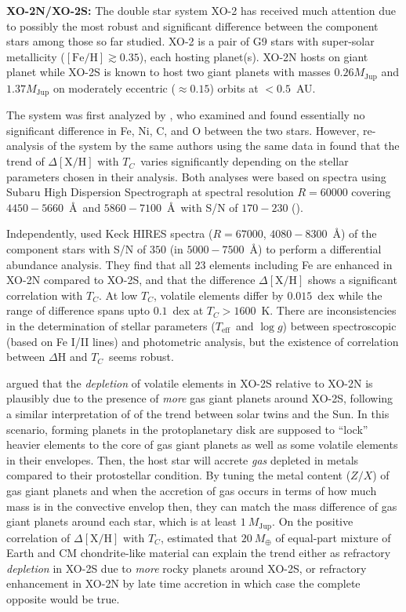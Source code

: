 \documentclass[manuscript]{aastex6}
\newcommand*\elem[1]{\ensuremath{\mathrm{#1}}}
\newcommand*\elemH[1]{\ensuremath{[\mathrm{#1}/\elem{H}]}}
\newcommand*\teff{\ensuremath{T_\mathrm{eff}}}
\newcommand*\logg{\ensuremath{\log{g}}}
\newcommand*{\feh}{\ensuremath{\elemH{Fe}}}
\newcommand{\Tcondens}{\ensuremath{T_C}}
\newcommand{\mearth}{\ensuremath{M_\oplus}}
\newcommand{\mjupiter}{\ensuremath{M_\mathrm{Jup}}}
\begin{document}
{\bf XO-2N/XO-2S:}
The double star system XO-2 has received much attention due to
possibly the most robust and significant difference between the component stars
among those so far studied.
XO-2 is a pair of G9 stars with super-solar metallicity ($\feh \gtrsim 0.35$),
each hosting planet(s).
XO-2N hosts on giant planet while XO-2S is known to host two giant planets with
masses $0.26 \mjupiter$ and $1.37 \mjupiter$ on moderately eccentric ($\approx
0.15$) orbits at $<0.5$~AU.

The system was first analyzed by \citealt{Teske:2013aa}, who examined and found
essentially no significant difference in Fe, Ni, C, and O between the two
stars.
However, re-analysis of the system by the same authors using the same data in
\citealt{Teske:2015aa} found that the trend of $\Delta\elemH{X}$ with
\Tcondens\ varies significantly depending on the stellar parameters chosen in
their analysis. Both analyses were based on spectra
using Subaru High Dispersion Spectrograph at spectral resolution $R=60000$
covering $4450-5660$~\AA\ and $5860-7100$~\AA\ with S/N of $170-230$
(\citealt{Teske:2013aa}).

Independently, \citealt{Ramirez:2015aa} used Keck HIRES spectra ($R=67000$,
$4080-8300$~\AA) of the component stars with S/N of $350$ (in $5000-7500$~\AA)
to perform a differential abundance analysis.
They find that all 23 elements including Fe are enhanced in XO-2N
compared to XO-2S, and that the difference $\Delta\elemH{X}$ shows
a significant correlation with \Tcondens.
At low \Tcondens, volatile elements differ by $0.015$~dex
while the range of difference spans upto $0.1$~dex at $\Tcondens>1600$~K.
There are inconsistencies in the determination of stellar parameters
(\teff\ and \logg) between spectroscopic (based on Fe I/II lines)
and photometric analysis,
but the existence of correlation between $\Delta\elem{H}$ and
\Tcondens\ seems robust.

\citealt{Ramirez:2015aa} argued that the {\it depletion} of volatile elements
in XO-2S relative to XO-2N is plausibly due to the presence of {\it more} gas
giant planets around XO-2S, following a similar interpretation of
\citealt{Melendez:2009aa} of the trend between solar twins and the Sun.
In this scenario, forming planets in the protoplanetary disk are supposed to
``lock'' heavier elements to the core of gas giant planets as well as some
volatile elements in their envelopes. Then, the host star will accrete {\it
  gas} depleted in metals compared to their protostellar condition.
By tuning the metal content ($Z/X$) of gas giant planets and when the accretion
of gas occurs in terms of how much mass is in the convective envelop then, they
can match the mass difference of gas giant planets around each star, which is
at least $1~\mjupiter$.
On the positive correlation of $\Delta\elemH{X}$ with \Tcondens,
\citealt{Ramirez:2015aa} estimated that $20~\mearth$ of equal-part mixture of
Earth and CM chondrite-like material can explain the trend either as refractory
{\it depletion} in XO-2S due to {\it more} rocky planets around XO-2S, or
refractory enhancement in XO-2N by late time accretion in which case the
complete opposite would be true.
\end{document}
